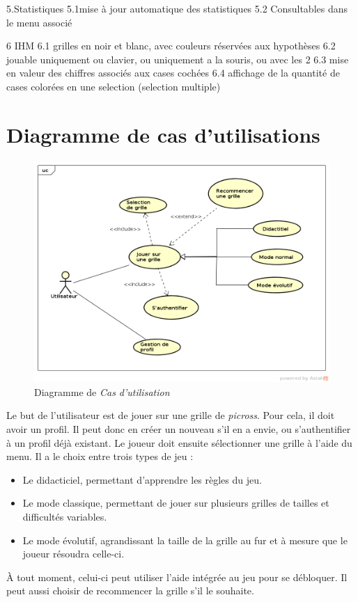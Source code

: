 \documentclass{report}
\begin{document}
	5.Statistiques
		5.1mise à jour automatique des statistiques
		5.2 Consultables dans le menu associé
		
	6 IHM
		6.1 grilles en noir et blanc, avec couleurs réservées aux hypothèses
		6.2 jouable uniquement ou clavier, ou uniquement a la souris, ou avec les 2
		6.3 mise en valeur des chiffres associés aux cases cochées
		6.4 affichage de la quantité de cases colorées en une selection (selection multiple)
		
   \section{Diagramme de cas d'utilisations}
      
    \begin{figure}[H]
	\caption{Diagramme de \textit{Cas d’utilisation}}
	\includegraphics[width=17cm]{../UML/UseCase_diagram/UseCase1.png}
    \end{figure}
    

	Le but de l'utilisateur est de jouer sur une grille de \textit{picross}.
Pour cela, il doit avoir un profil. Il peut donc en créer un nouveau s'il en a envie, ou s'authentifier à un profil déjà existant.
	Le joueur doit ensuite sélectionner une grille à l'aide du menu. Il a le choix entre trois types de jeu :
	\begin{itemize}
	\item Le didacticiel, permettant d'apprendre les règles du jeu. 
	\item Le mode classique, permettant de jouer sur plusieurs grilles de tailles et difficultés variables.
	\item Le mode évolutif, agrandissant la taille de la grille au fur et à mesure que le joueur résoudra celle-ci.
	\end{itemize}
	À tout moment, celui-ci peut utiliser l'aide intégrée au jeu pour se débloquer. Il peut aussi choisir de recommencer la grille s'il le souhaite.
\end{document}
